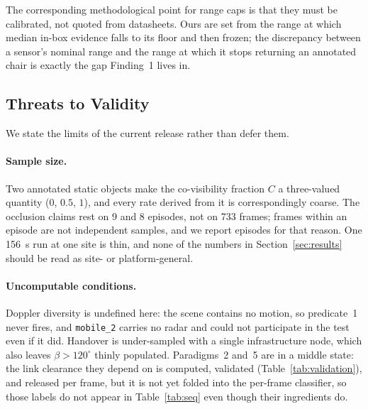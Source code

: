 The corresponding methodological point for range caps is that they must be
calibrated, not quoted from datasheets. Ours are set from the range at which
median in-box evidence falls to its floor and then frozen; the discrepancy
between a sensor's nominal range and the range at which it stops returning an
annotated chair is exactly the gap Finding~1 lives in.

\subsection{Threats to Validity}

We state the limits of the current release rather than defer them.

\paragraph{Sample size.} Two annotated static objects make the co-visibility
fraction $C$ a three-valued quantity ($0$, $0.5$, $1$), and every rate derived
from it is correspondingly coarse. The occlusion claims rest on 9 and 8
episodes, not on 733 frames; frames within an episode are not independent
samples, and we report episodes for that reason. One \SI{156}{\second} run at
one site is thin, and none of the numbers in Section~\ref{sec:results} should
be read as site- or platform-general.

\paragraph{Uncomputable conditions.} Doppler diversity is undefined here: the
scene contains no motion, so predicate~1 never fires, and \texttt{mobile\_2}
carries no radar and could not participate in the test even if it did.
Handover is under-sampled with a single infrastructure node, which also leaves
$\beta > 120^\circ$ thinly populated. Paradigms~2 and~5 are in a middle state:
the link clearance they depend on is computed, validated
(Table~\ref{tab:validation}), and released per frame, but it is not yet folded
into the per-frame classifier, so those labels do not appear in
Table~\ref{tab:seq} even though their ingredients do.

